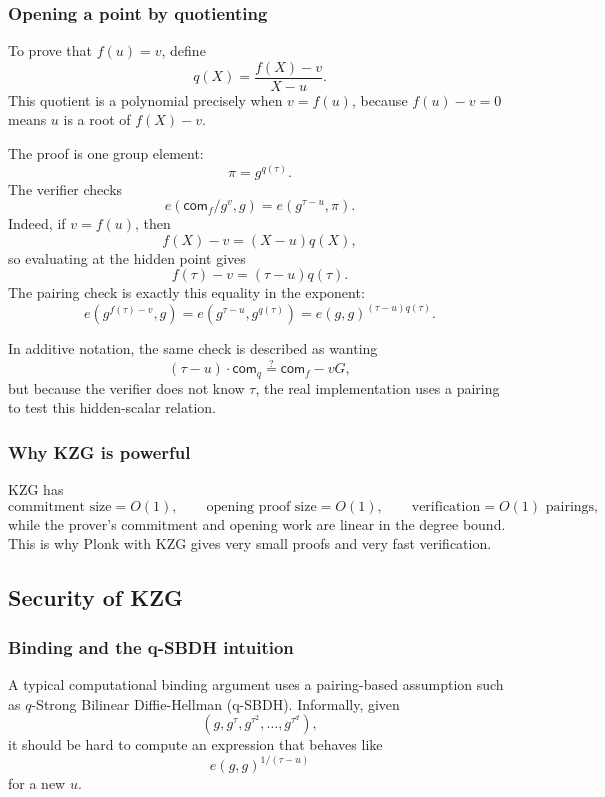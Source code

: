 \subsubsection{Opening a point by quotienting}

To prove that $f(u)=v$, define
\[
    q(X)=\frac{f(X)-v}{X-u}.
\]
This quotient is a polynomial precisely when $v=f(u)$, because $f(u)-v=0$ means $u$ is a root of $f(X)-v$.

The proof is one group element:
\[
    \pi=g^{q(\tau)}.
\]
The verifier checks
\[
    e(\mathsf{com}_f/g^v,g)=e(g^{\tau-u},\pi).
\]
Indeed, if $v=f(u)$, then
\[
    f(X)-v=(X-u)q(X),
\]
so evaluating at the hidden point gives
\[
    f(\tau)-v=(\tau-u)q(\tau).
\]
The pairing check is exactly this equality in the exponent:
\[
    e(g^{f(\tau)-v},g)=e(g^{\tau-u},g^{q(\tau)})=e(g,g)^{(\tau-u)q(\tau)}.
\]

In additive notation, the same check is described as wanting
\[
    (\tau-u)\cdot \mathsf{com}_q \stackrel{?}{=} \mathsf{com}_f-vG,
\]
but because the verifier does not know $\tau$, the real implementation uses a pairing to test this hidden-scalar relation.

\subsubsection{Why KZG is powerful}

KZG has
\[
    \text{commitment size}=O(1),
    \qquad
    \text{opening proof size}=O(1),
    \qquad
    \text{verification}=O(1)\text{ pairings},
\]
while the prover's commitment and opening work are linear in the degree bound. This is why Plonk with KZG gives very small proofs and very fast verification.

\subsection{Security of KZG}

\subsubsection{Binding and the q-SBDH intuition}

A typical computational binding argument uses a pairing-based assumption such as $q$-Strong Bilinear Diffie-Hellman (q-SBDH). Informally, given
\[
    (g,g^\tau,g^{\tau^2},\ldots,g^{\tau^d}),
\]
it should be hard to compute an expression that behaves like
\[
    e(g,g)^{1/(\tau-u)}
\]
for a new $u$.

